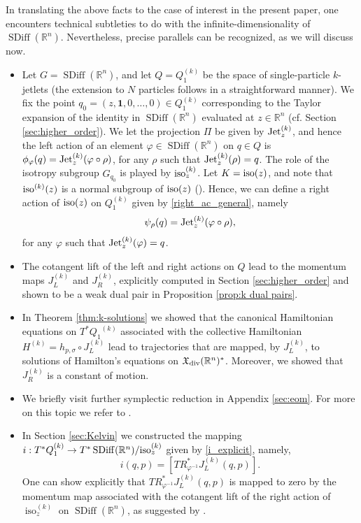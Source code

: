 \documentclass[12pt]{amsart}
\newcommand{\R}{\ensuremath{\mathbb{R}}}
\DeclareMathOperator{\SDiff}{SDiff}
\DeclareMathOperator{\iso}{iso}
\begin{document}
%
In translating the above facts to the case of interest in the present paper, one encounters technical subtleties to do with the infinite-dimensionality of $\SDiff(\R^n)$. Nevertheless, precise parallels can be recognized, as we will discuss now.
\begin{itemize}
\item Let $G = \SDiff(\R^n)$, and let $Q= Q_1^{(k)}$ be the space of single-particle $k$-jetlets (the extension to $N$ particles follows in a straightforward manner). We fix the point $q_0 = (z, \mathbf{1}, 0, \ldots, 0) \in Q_1^{(k)}$ corresponding to the Taylor expansion of the identity in $\SDiff(\R^n)$ evaluated at $z \in \R^n$ (cf. Section \ref{sec:higher_order}). We let the projection $\Pi$ be given by ${\rm Jet}_z^{(k)}$, and hence the left action of an element $\varphi \in \SDiff(\R^n)$ on $q \in Q$ is $\phi_\varphi(q) = {\rm Jet}_z^{(k)}(\varphi \circ \rho)$, for any $\rho$ such that ${\rm Jet}_z^{(k)}(\rho) = q$. The role of the isotropy subgroup $G_{q_0}$ is played by ${\rm iso}^{(k)}_z$. Let $K = {\rm iso}(z)$, and note that ${\rm iso}^{(k)}(z)$ is a normal subgroup of ${\rm iso}(z)$ (\cite[Proposition 4.1]{JacobsRatiuDesbrun2013}). Hence, we can define a right action of ${\rm iso}(z)$ on $Q_1^{(k)}$ given by \eqref{right_ac_general}, namely
  \begin{equation*}
    \psi_\rho(q) = {\rm Jet}_z^{(k)}(\varphi \circ \rho),
  \end{equation*}
for any $\varphi$ such that ${\rm Jet}_z^{(k)}(\varphi) = q$.
\item The cotangent lift of the left and right actions on $Q$ lead to the momentum maps $J_L^{(k)}$ and $J_R^{(k)}$, explicitly computed in Section  \ref{sec:higher_order} and shown to be a weak dual pair in Proposition \ref{prop:k dual pairs}.
\item  In Theorem \ref{thm:k-solutions} we showed that the canonical Hamiltonian equations on $T^*{Q_1}^{(k)}$ associated with the collective Hamiltonian $H^{(k)} = h_{p, \sigma} \circ J_L^{(k)}$ lead to trajectories that are mapped, by $J_L^{(k)}$, to solutions of Hamilton's equations on $\mathfrak{X}_{\rm div}(\R^n)^*$. Moreover, we showed that $J_R^{(k)}$ is a constant of motion.
\item We briefly visit further symplectic reduction in Appendix \ref{sec:eom}. For more on this topic we refer to \cite{JacobsRatiuDesbrun2013, CotterHolmJacobsMeier2014}.
\item In Section \ref{sec:Kelvin} we constructed the mapping $i:T^*Q_1^{(k)} \to T^*\SDiff(\R^n)/{\rm iso}^{(k)}_z$ given by \eqref{i_explicit}, namely,
\begin{equation*}
 	i(q, p) = [TR^*_{\varphi^{-1}} J_L^{(k)}(q, p)].
 \end{equation*}
One can show explicitly that $TR^*_{\varphi^{-1}} J_L^{(k)}(q, p)$ is mapped to zero by the momentum map associated with the cotangent lift of the right action of $\iso^{(k)}_z$ on $\SDiff(\R^n)$, as suggested by \cite[Theorem~2.2.2]{HRS}.
\end{itemize}
\end{document}
